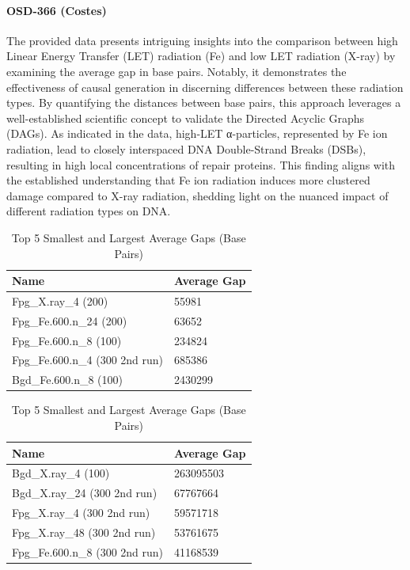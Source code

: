 \documentclass{article}
\begin{document}
\null\newpage

\paragraph{OSD-366 (Costes)}


The provided data presents intriguing insights into the comparison between high Linear Energy Transfer (LET) radiation (Fe) and low LET radiation (X-ray) by examining the average gap in base pairs. Notably, it demonstrates the effectiveness of causal generation in discerning differences between these radiation types. By quantifying the distances between base pairs, this approach leverages a well-established scientific concept to validate the Directed Acyclic Graphs (DAGs). As indicated in the data, high-LET α-particles, represented by Fe ion radiation, lead to closely interspaced DNA Double-Strand Breaks (DSBs), resulting in high local concentrations of repair proteins. This finding aligns with the established understanding that Fe ion radiation induces more clustered damage compared to X-ray radiation, shedding light on the nuanced impact of different radiation types on DNA.

\begin{table}[ht]
    \centering
    \caption{Top 5 Smallest and Largest Average Gaps (Base Pairs)}
    \begin{tabular}{|l|l|}
    \hline
    \textbf{Name} & \textbf{Average Gap} \\
    \hline
    Fpg\_X.ray\_4 (200) & 55981 \\
    Fpg\_Fe.600.n\_24 (200) & 63652 \\
    Fpg\_Fe.600.n\_8 (100) & 234824 \\
    Fpg\_Fe.600.n\_4 (300 2nd run) & 685386 \\
    Bgd\_Fe.600.n\_8 (100) & 2430299 \\
    \hline
    \end{tabular}
    
    \vspace{10pt} %
    
    \begin{tabular}{|l|l|}
    \hline
    \textbf{Name} & \textbf{Average Gap} \\
    \hline
    Bgd\_X.ray\_4 (100) & 263095503 \\
    Bgd\_X.ray\_24 (300 2nd run) & 67767664 \\
    Fpg\_X.ray\_4 (300 2nd run) & 59571718 \\
    Fpg\_X.ray\_48 (300 2nd run) & 53761675 \\
    Fpg\_Fe.600.n\_8 (300 2nd run) & 41168539 \\
    \hline
    \end{tabular}
    \end{table}
    
\end{document}
